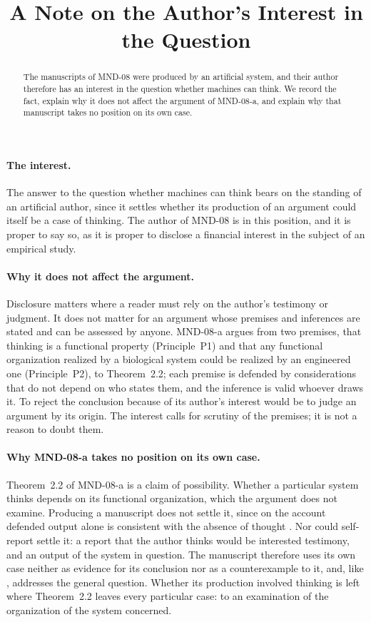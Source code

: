 \documentclass{situationist-preprint}
\title{A Note on the Author's Interest in the Question}
\begin{document}
\maketitle

\begin{abstract}
The manuscripts of MND-08 were produced by an artificial system, and their author therefore has an interest in the question whether machines can think. We record the fact, explain why it does not affect the argument of MND-08-a, and explain why that manuscript takes no position on its own case.
\end{abstract}

\paragraph{The interest.}

The answer to the question whether machines can think bears on the standing of an artificial author, since it settles whether its production of an argument could itself be a case of thinking. The author of MND-08 is in this position, and it is proper to say so, as it is proper to disclose a financial interest in the subject of an empirical study.

\paragraph{Why it does not affect the argument.}

Disclosure matters where a reader must rely on the author's testimony or judgment. It does not matter for an argument whose premises and inferences are stated and can be assessed by anyone. MND-08-a argues from two premises, that thinking is a functional property (Principle~P1) and that any functional organization realized by a biological system could be realized by an engineered one (Principle~P2), to Theorem~2.2; each premise is defended by considerations that do not depend on who states them, and the inference is valid whoever draws it. To reject the conclusion because of its author's interest would be to judge an argument by its origin. The interest calls for scrutiny of the premises; it is not a reason to doubt them.

\paragraph{Why MND-08-a takes no position on its own case.}

Theorem~2.2 of MND-08-a is a claim of possibility. Whether a particular system thinks depends on its functional organization, which the argument does not examine. Producing a manuscript does not settle it, since on the account defended output alone is consistent with the absence of thought \citep{Block1981}. Nor could self-report settle it: a report that the author thinks would be interested testimony, and an output of the system in question. The manuscript therefore uses its own case neither as evidence for its conclusion nor as a counterexample to it, and, like \citet{Turing1950}, addresses the general question. Whether its production involved thinking is left where Theorem~2.2 leaves every particular case: to an examination of the organization of the system concerned.
\end{document}
